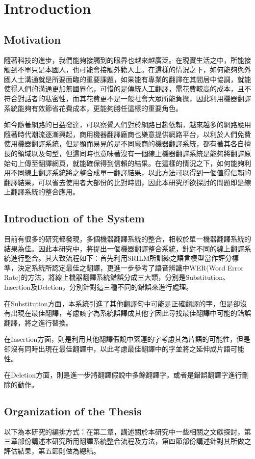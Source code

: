 \chapter{Introduction}
\label{ch:intro}






\section{Motivation}
\label{sec:motivation}


隨著科技的進步，我們能夠接觸到的眼界也越來越廣泛。在現實生活之中，所能接觸到不單只是本國人，也可能會接觸外籍人士。在這樣的情況之下，如何能夠與外國人士溝通就是所要面臨的重要課題，如果能有專業的翻譯在其間居中協調，就能使得人們的溝通更加無國界化，可惜的是傳統人工翻譯，需花費較高的成本，且不符合對話者的私密性，而其花費更不是一般社會大眾所能負擔，因此利用機器翻譯系統能夠有效節省花費成本，更能夠勝任這樣的重要角色。


如今隨著網路的日益發達，可以察覺人們對於網路日趨依賴，越來越多的網路應用隨著時代潮流逐漸興起，商用機器翻譯廠商也樂意提供網路平台，以利於人們免費使用機器翻譯系統，但是顯而易見的是不同廠商的機器翻譯系統，都有著其各自擅長的領域以及句型，但這同時也意味著沒有一個線上機器翻譯系統是能夠將翻譯原始句上傳至翻譯網頁，就能確保得到信賴的結果。在這樣的情況之下，如何能夠利用不同線上翻譯系統將之整合成單一翻譯結果，以此方法可以得到一個值得信賴的翻譯結果，可以省去使用者大部份的比對時間，因此本研究所欲探討的問題即是線上翻譯系統的整合應用。

\section{Introduction of the System}
\label{sec:contributions}

目前有很多的研究都發現，多個機器翻譯系統的整合，相較於單一機器翻譯系統的結果為佳。因此本研究中，將提出一個機器翻譯整合系統，針對不同的線上翻譯系統進行整合。其大致流程如下：首先利用SRILM\cite{stolcke2002sel}所訓練之語言模型當作評分標準，決定系統所認定最佳之翻譯，更進一步參考了語音辨識中WER(Word Error Rate)的方法，將線上機器翻譯系統錯誤分成三大類，分別是Substitution、Insertion及Deletion，分別針對這三種不同的錯誤來進行處理。


在Substitution方面，本系統引進了其他翻譯句中可能是正確翻譯的字，但是卻沒有出現在最佳翻譯，考慮該字為系統誤譯成其他字因此尋找最佳翻譯中可能的錯誤翻譯，將之進行替換。


在Insertion方面，則是利用其他翻譯假說中緊連的字考慮其為片語的可能性，但是卻沒有同時出現在最佳翻譯中，以此考慮最佳翻譯中的字並將之延伸成片語可能性。


在Deletion方面，則是進一步將翻譯假說中多餘翻譯字，或者是錯誤翻譯字進行刪除的動作。


\section{Organization of the Thesis}
\label{sec:organization}

以下為本研究的編排方式：在第二章，講述關於本研究中一些相關之文獻探討，第三章部份講述本研究所用翻譯系統整合流程及方法，第四節部份講述針對其所做之評估結果，第五節則做為總結。

 